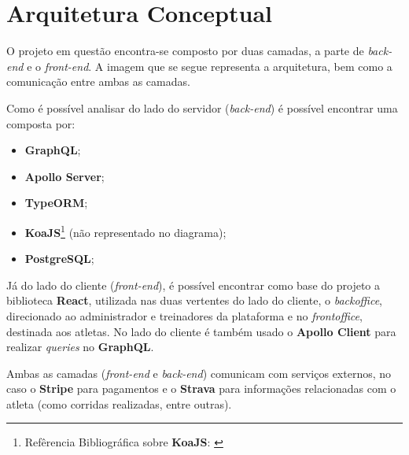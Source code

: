 \section{Arquitetura Conceptual}

O projeto em questão encontra-se composto por duas camadas, a parte de \textit{back-end} e o \textit{front-end}. A imagem que se segue representa a arquitetura, bem como a comunicação entre ambas as camadas.


Como é possível analisar do lado do servidor (\textit{back-end}) é possível encontrar uma \textbf{} composta por:

\begin{itemize}
	\item \textbf{GraphQL};
	\item \textbf{Apollo Server};
	\item \textbf{TypeORM};
	\item \textbf{KoaJS}\footnote{Refêrencia Bibliográfica sobre \textbf{KoaJS}: \cite{expressVsKoa,introkoa}} {\small(não representado no diagrama)};
	\item \textbf{PostgreSQL};
\end{itemize}

Já do lado do cliente (\textit{front-end}), é possível encontrar como base do projeto a biblioteca \textbf{React}, utilizada nas duas vertentes do lado do cliente, o \textit{backoffice}, direcionado ao administrador e treinadores da plataforma e no \textit{frontoffice}, destinada aos atletas. No lado do cliente é também usado o \textbf{Apollo Client} para realizar \textit{queries} no \textbf{GraphQL}.

Ambas as camadas (\textit{front-end} e \textit{back-end}) comunicam com serviços externos, no caso o \textbf{Stripe} para pagamentos e o \textbf{Strava} para informações relacionadas com o atleta (como corridas realizadas, entre outras).